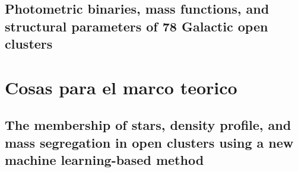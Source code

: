 \documentclass[../Main.tex]{subfiles}
\begin{document}
{\subsection{Photometric binaries, mass functions, and structural parameters of 78 Galactic open clusters}


\section{Cosas para el marco teorico}
\subsection{The membership of stars, density profile, and mass segregation in open clusters using a new machine learning-based method} %

}
\end{document}
